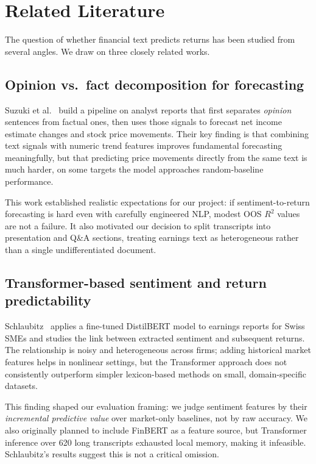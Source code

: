 \documentclass[conference]{IEEEtran}
\begin{document}
\section{Related Literature}
\label{sec:litreview}

The question of whether financial text predicts returns has been studied from
several angles. We draw on three closely related works.

\subsection{Opinion vs.\ fact decomposition for forecasting}

Suzuki et al.~\cite{ref_suzuki2020} build a pipeline on analyst reports that
first separates \emph{opinion} sentences from factual ones, then uses those
signals to forecast net income estimate changes and stock price movements.
Their key finding is that combining text signals with numeric trend features
improves fundamental forecasting meaningfully, but that predicting price
movements directly from the same text is much harder, on some targets the
model approaches random-baseline performance.

This work established realistic expectations for our project: if sentiment-to-return
forecasting is hard even with carefully engineered NLP, modest OOS $R^2$ values
are not a failure. It also motivated our decision to split transcripts into
presentation and Q\&A sections, treating earnings text as heterogeneous rather
than a single undifferentiated document.

\subsection{Transformer-based sentiment and return predictability}

Schlaubitz~\cite{ref_schlaubitz2021} applies a fine-tuned DistilBERT model to
earnings reports for Swiss SMEs and studies the link between extracted sentiment
and subsequent returns. The relationship is noisy and heterogeneous across
firms; adding historical market features helps in nonlinear settings, but the
Transformer approach does not consistently outperform simpler lexicon-based
methods on small, domain-specific datasets.

This finding shaped our evaluation framing: we judge sentiment features by their
\emph{incremental predictive value} over market-only baselines, not by raw
accuracy. We also originally planned to include FinBERT as a feature source,
but Transformer inference over 620 long transcripts exhausted local memory,
making it infeasible. Schlaubitz's results suggest this is not a critical omission.
\end{document}

